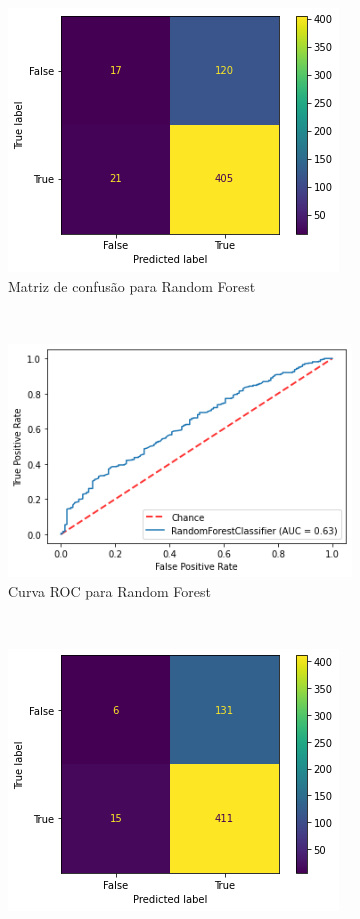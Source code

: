 \begin{figure}[htb] 
    \centering 
    \caption{Resultado tentativas de classificação para cada método aplicado sobre dados mensais de CNAE}
    \label{fig:resultados:classification-monthly-cnae} 
    \begin{subfigure}[b]{0.45\textwidth}
        \includegraphics[scale=0.45]{images/base-de-dados-28.3.1-confusion-matrix-randomforest-monthly-cnae.png}
        \caption{Matriz de confusão para Random Forest}
        \label{fig:resultadosbase-de-dados-28.3.1-confusion-matrix-randomforest-monthly-cnae}
    \end{subfigure} ~ \quad
    \begin{subfigure}[b]{0.45\textwidth}
        \includegraphics[scale=0.45]{images/base-de-dados-28.3.2-roc-curve-randomforest-monthly-cnae.png}
        \caption{Curva ROC para Random Forest}
        \label{fig:resultados:base-de-dados-28.3.2-roc-curve-randomforest-monthly-cnae}
    \end{subfigure} ~ \\
    \centering 
    \begin{subfigure}[b]{0.45\textwidth}
        \includegraphics[scale=0.45]{images/base-de-dados-28.3.3-confusion-matrix-svc-monthly-cnae.png}

\end{subfigure}
\end{figure}
